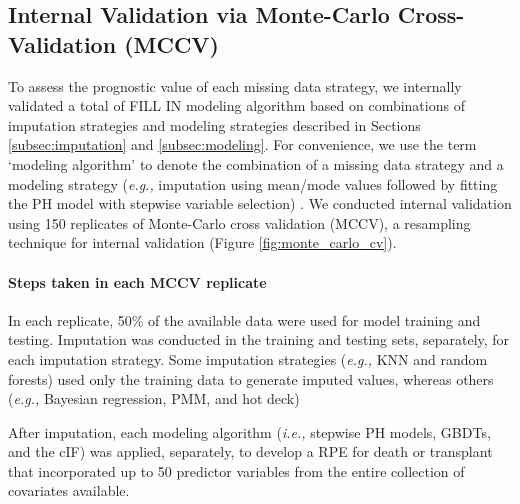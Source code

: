 \documentclass{article}
\begin{document}
\hypertarget{internal-validation-via-monte-carlo-cross-validation-mccv}{%
\subsection{Internal Validation via Monte-Carlo Cross-Validation
(MCCV)}\label{internal-validation-via-monte-carlo-cross-validation-mccv}}

\label{subsec:internal}

To assess the prognostic value of each missing data strategy, we
internally validated a total of FILL IN modeling algorithm based on
combinations of imputation strategies and modeling strategies described
in Sections \ref{subsec:imputation} and \ref{subsec:modeling}. For
convenience, we use the term `modeling algorithm' to denote the
combination of a missing data strategy and a modeling strategy
(\textit{e.g., }imputation using mean/mode values followed by fitting
the PH model with stepwise variable selection) \cite{kuhn2013applied}.
We conducted internal validation using 150 replicates of Monte-Carlo
cross validation (MCCV), a resampling technique for internal validation
(Figure \ref{fig:monte_carlo_cv}).

\paragraph{Steps taken in each MCCV replicate}

In each replicate, 50\% of the available data were used for model
training and testing. Imputation was conducted in the training and
testing sets, separately, for each imputation strategy. Some imputation
strategies (\textit{e.g., }KNN and random forests) used only the
training data to generate imputed values, whereas others
(\textit{e.g., }Bayesian regression, PMM, and hot deck)

After imputation, each modeling algorithm (\textit{i.e., }stepwise PH
models, GBDTs, and the cIF) was applied, separately, to develop a RPE
for death or transplant that incorporated up to 50 predictor variables
from the entire collection of covariates available.



\end{document}
